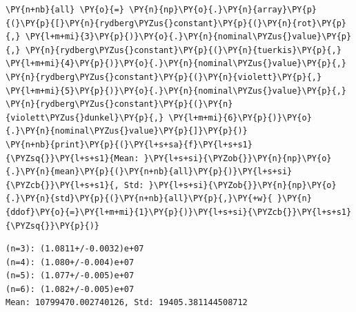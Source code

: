 \begin{tcolorbox}[breakable, size=fbox, boxrule=1pt, pad at break*=1mm,colback=cellbackground, colframe=cellborder]
\begin{Verbatim}[commandchars=\\\{\}]
\PY{n+nb}{all} \PY{o}{=} \PY{n}{np}\PY{o}{.}\PY{n}{array}\PY{p}{(}\PY{p}{[}\PY{n}{rydberg\PYZus{}constant}\PY{p}{(}\PY{n}{rot}\PY{p}{,} \PY{l+m+mi}{3}\PY{p}{)}\PY{o}{.}\PY{n}{nominal\PYZus{}value}\PY{p}{,} \PY{n}{rydberg\PYZus{}constant}\PY{p}{(}\PY{n}{tuerkis}\PY{p}{,} \PY{l+m+mi}{4}\PY{p}{)}\PY{o}{.}\PY{n}{nominal\PYZus{}value}\PY{p}{,} \PY{n}{rydberg\PYZus{}constant}\PY{p}{(}\PY{n}{violett}\PY{p}{,} \PY{l+m+mi}{5}\PY{p}{)}\PY{o}{.}\PY{n}{nominal\PYZus{}value}\PY{p}{,} \PY{n}{rydberg\PYZus{}constant}\PY{p}{(}\PY{n}{violett\PYZus{}dunkel}\PY{p}{,} \PY{l+m+mi}{6}\PY{p}{)}\PY{o}{.}\PY{n}{nominal\PYZus{}value}\PY{p}{]}\PY{p}{)}
\PY{n+nb}{print}\PY{p}{(}\PY{l+s+sa}{f}\PY{l+s+s1}{\PYZsq{}}\PY{l+s+s1}{Mean: }\PY{l+s+si}{\PYZob{}}\PY{n}{np}\PY{o}{.}\PY{n}{mean}\PY{p}{(}\PY{n+nb}{all}\PY{p}{)}\PY{l+s+si}{\PYZcb{}}\PY{l+s+s1}{, Std: }\PY{l+s+si}{\PYZob{}}\PY{n}{np}\PY{o}{.}\PY{n}{std}\PY{p}{(}\PY{n+nb}{all}\PY{p}{,}\PY{+w}{ }\PY{n}{ddof}\PY{o}{=}\PY{l+m+mi}{1}\PY{p}{)}\PY{l+s+si}{\PYZcb{}}\PY{l+s+s1}{\PYZsq{}}\PY{p}{)}
\end{Verbatim}
\end{tcolorbox}

    \begin{Verbatim}[commandchars=\\\{\}]
(n=3): (1.0811+/-0.0032)e+07
(n=4): (1.080+/-0.004)e+07
(n=5): (1.077+/-0.005)e+07
(n=6): (1.082+/-0.005)e+07
Mean: 10799470.002740126, Std: 19405.381144508712
    \end{Verbatim}

    \begin{tcolorbox}[breakable, size=fbox, boxrule=1pt, pad at break*=1mm,colback=cellbackground, colframe=cellborder]
\begin{Verbatim}[commandchars=\\\{\}]

\end{Verbatim}
\end{tcolorbox}

